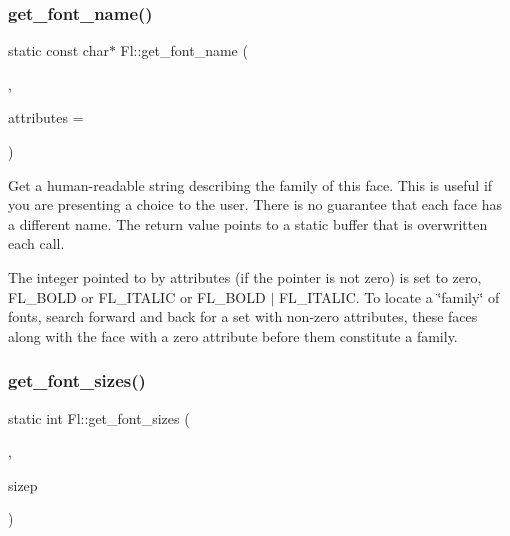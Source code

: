 \subsubsection{\texorpdfstring{get\+\_\+font\+\_\+name()}{get\_font\_name()}}
{\footnotesize\ttfamily static const char$\ast$ Fl\+::get\+\_\+font\+\_\+name (\begin{DoxyParamCaption}\item[{\hyperlink{_enumerations_8_h_a2ac46d9f082834b969fffe490a03a709}{Fl\+\_\+\+Font}}]{,  }\item[{int $\ast$}]{attributes = {} }\end{DoxyParamCaption})\hspace{0.3cm}{\ttfamily [static]}}

Get a human-\/readable string describing the family of this face. This is useful if you are presenting a choice to the user. There is no guarantee that each face has a different name. The return value points to a static buffer that is overwritten each call.

The integer pointed to by {\ttfamily attributes} (if the pointer is not zero) is set to zero, F\+L\+\_\+\+B\+O\+LD or F\+L\+\_\+\+I\+T\+A\+L\+IC or F\+L\+\_\+\+B\+O\+LD $\vert$ F\+L\+\_\+\+I\+T\+A\+L\+IC. To locate a \char`\"{}family\char`\"{} of fonts, search forward and back for a set with non-\/zero attributes, these faces along with the face with a zero attribute before them constitute a family. \mbox{\label{group__fl__attributes_ga3751aad3db88d47d05eea1b1c90b2c47}} 
\subsubsection{\texorpdfstring{get\+\_\+font\+\_\+sizes()}{get\_font\_sizes()}}
{\footnotesize\ttfamily static int Fl\+::get\+\_\+font\+\_\+sizes (\begin{DoxyParamCaption}\item[{\hyperlink{_enumerations_8_h_a2ac46d9f082834b969fffe490a03a709}{Fl\+\_\+\+Font}}]{,  }\item[{int $\ast$\&}]{sizep }\end{DoxyParamCaption})\hspace{0.3cm}{\ttfamily [static]}}

